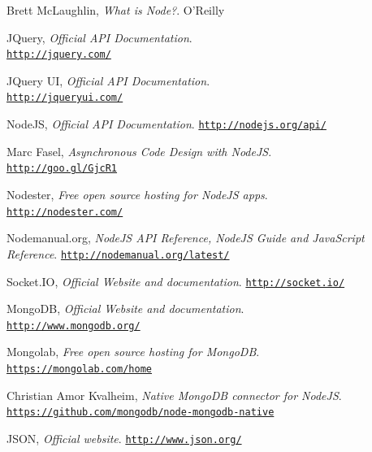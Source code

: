 \documentclass[12pt,a4paper]{article}
\begin{document}
\begin{thebibliography}{100}


  Brett McLaughlin,
  \emph{What is Node?}. O'Reilly

  JQuery,
  \emph{Official API Documentation}.\\\href{http://jquery.com/}{\tt http://jquery.com/}

  JQuery UI,
  \emph{Official API Documentation}.\\\href{http://jqueryui.com/}{\tt http://jqueryui.com/}

  NodeJS,
  \emph{Official API Documentation}. \href{http://nodejs.org/api/}{\tt http://nodejs.org/api/}

  Marc Fasel,
  \emph{Asynchronous Code Design with NodeJS}.\\\href{http://goo.gl/GjcR1}{\tt http://goo.gl/GjcR1}

  Nodester,
  \emph{Free open source hosting for NodeJS apps}.\\\href{http://nodester.com/}{\tt http://nodester.com/}

  Nodemanual.org,
  \emph{NodeJS API Reference, NodeJS Guide and JavaScript Reference}. \href{http://nodemanual.org/latest/}{\tt http://nodemanual.org/latest/}

  Socket.IO,
  \emph{Official Website and documentation}. \href{http://socket.io/}{\tt http://socket.io/}

  MongoDB,
  \emph{Official Website and documentation}.\\\href{http://www.mongodb.org/}{\tt http://www.mongodb.org/}

  Mongolab,
  \emph{Free open source hosting for MongoDB}.\\\href{https://mongolab.com/home}{\tt https://mongolab.com/home}

  Christian Amor Kvalheim,
  \emph{Native MongoDB connector for NodeJS}. \href{https://github.com/mongodb/node-mongodb-native}{\tt https://github.com/mongodb/node-mongodb-native}

  JSON,
  \emph{Official website}. \href{http://www.json.org/}{\tt http://www.json.org/}


\end{thebibliography}
\end{document}
